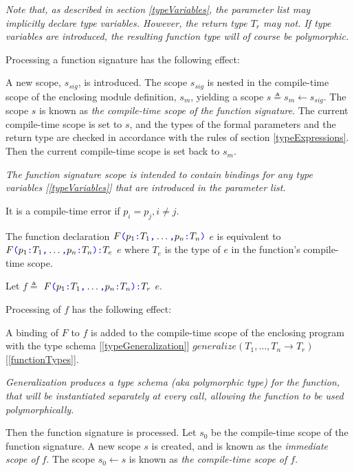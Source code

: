 \documentclass{article}
\begin{document}
{\em
Note that,  as described in section \ref{typeVariables}, the parameter list may implicitly declare type variables. However, the return type $T_r$ may not. If type variables are introduced, the resulting function type will of course be polymorphic. 
}

Processing a function signature has the following effect:

A new scope, $s_{sig}$, is introduced. The scope $s_{sig}$ is nested in the compile-time scope of the enclosing module definition, $s_m$, yielding a scope $s \triangleq s_m \leftarrow s_{sig}$. The scope $s$ is known as {\em the compile-time scope of the function signature}.
The current compile-time scope is set to $s$, and the types of the formal parameters and the return type are checked in accordance with the rules of section \ref{typeExpressions}. Then the current compile-time scope is set back to $s_m$.

{\em 
The function signature scope is intended to contain bindings for any type variables [\ref{typeVariables}] that are introduced in the parameter list.
}

It is a compile-time error if $p_i = p_j, i \ne j$.

The function declaration \FUNC{}  $F\texttt{\color{blue} (}{}p_1\texttt{\color{blue} :} T_1\texttt{\color{blue} ,}{} \ldots\texttt{\color{blue} ,}{} p_n\texttt{\color{blue} :} T_n\texttt{\color{blue} )}{}$  \BIND{} $e$ is equivalent to \FUNC{} $F\texttt{\color{blue} (}{}p_1\texttt{\color{blue} :} T_1\texttt{\color{blue} ,}{} \ldots\texttt{\color{blue} ,}{} p_n\texttt{\color{blue} :} T_n\texttt{\color{blue} )}{}\texttt{\color{blue} :} T_e$  \BIND{} $e$ where $T_e$ is the type of $e$ in the function's compile-time scope.

Let $f \triangleq$ \FUNC{} $F\texttt{\color{blue} (}{}p_1\texttt{\color{blue} :} T_1\texttt{\color{blue} ,}{} \ldots\texttt{\color{blue} ,}{} p_n\texttt{\color{blue} :} T_n\texttt{\color{blue} )}{}\texttt{\color{blue} :} T_r$  \BIND{} $e$.

Processing of $f$  has the following effect:

A binding of $F$ to $f$ is added to the compile-time scope of the enclosing program with the type schema [\ref{typeGeneralization}] $generalize(T_1, \ldots, T_n \to T_r)$ [\ref{functionTypes}].

{\em
Generalization produces a type schema (aka polymorphic type) for the function, that will be instantiated separately at every call, allowing the function to be used polymorphically. 
}

 Then the function signature is processed. Let $s_0$ be the compile-time scope of the function signature.
A new scope $s$ is created, and is known as the {\em immediate scope of} $f$. The scope $s_0 \leftarrow s$ is known as {\em the compile-time scope of $f$}.
\end{document}
